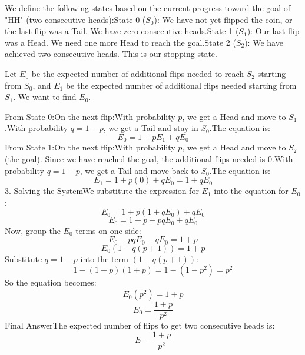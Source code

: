 \documentclass{report}
\begin{document}
\begin{sol}

    We define the following states based on the current progress toward the goal of "HH" (two consecutive heads):State 0 ($S_0$): We have not yet flipped the coin, or the last flip was a Tail. We have zero consecutive heads.State 1 ($S_1$): Our last flip was a Head. We need one more Head to reach the goal.State 2 ($S_2$): We have achieved two consecutive heads. This is our stopping state.

    Let $E_0$ be the expected number of additional flips needed to reach $S_2$ starting from $S_0$, and $E_1$ be the expected number of additional flips needed starting from $S_1$. We want to find $E_0$.

    From State 0:On the next flip:With probability $p$, we get a Head and move to $S_1$.With probability $q = 1-p$, we get a Tail and stay in $S_0$.The equation is:$$E_0 = 1 + p E_1 + q E_0$$From State 1:On the next flip:With probability $p$, we get a Head and move to $S_2$ (the goal). Since we have reached the goal, the additional flips needed is $0$.With probability $q = 1-p$, we get a Tail and move back to $S_0$.The equation is:$$E_1 = 1 + p(0) + q E_0 = 1 + q E_0$$3. Solving the SystemWe substitute the expression for $E_1$ into the equation for $E_0$:$$E_0 = 1 + p(1 + q E_0) + q E_0$$$$E_0 = 1 + p + pq E_0 + q E_0$$Now, group the $E_0$ terms on one side:$$E_0 - pq E_0 - q E_0 = 1 + p$$$$E_0 (1 - q(p + 1)) = 1 + p$$Substitute $q = 1-p$ into the term $(1 - q(p+1))$:$$1 - (1-p)(1+p) = 1 - (1 - p^2) = p^2$$So the equation becomes:$$E_0 (p^2) = 1 + p$$$$E_0 = \frac{1+p}{p^2}$$Final AnswerThe expected number of flips to get two consecutive heads is:$$E = \frac{1+p}{p^2}$$


    \end{sol}

\end{document}
